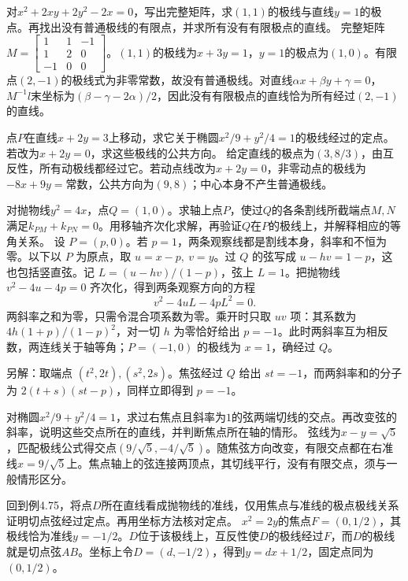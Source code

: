 对\(x^2+2xy+2y^2-2x=0\)，写出完整矩阵，求\((1,1)\)的极线与直线\(y=1\)的极点。再找出没有普通极线的有限点，并求所有没有有限极点的直线。
\solutionanswer
完整矩阵\(M=\begin{bmatrix}1&1&-1\\1&2&0\\-1&0&0\end{bmatrix}\)。\((1,1)\)的极线为\(x+3y=1\)，\(y=1\)的极点为\((1,0)\)。有限点\((2,-1)\)的极线式为非零常数，故没有普通极线。对直线\(\alpha x+\beta y+\gamma=0\)，\(M^{-1}l\)末坐标为\((\beta-\gamma-2\alpha)/2\)，因此没有有限极点的直线恰为所有经过\((2,-1)\)的直线。


点\(P\)在直线\(x+2y=3\)上移动，求它关于椭圆\(x^2/9+y^2/4=1\)的极线经过的定点。若改为\(x+2y=0\)，求这些极线的公共方向。
\solutionanswer
给定直线的极点为\((3,8/3)\)，由互反性，所有动极线都经过它。若动点线改为\(x+2y=0\)，非零动点的极线为\(-8x+9y=\text{常数}\)，公共方向为\((9,8)\)；中心本身不产生普通极线。


对抛物线\(y^2=4x\)，点\(Q=(1,0)\)。求轴上点\(P\)，使过\(Q\)的各条割线所截端点\(M,N\)满足\(k_{PM}+k_{PN}=0\)。用移轴齐次化求解，再验证\(Q\)在\(P\)的极线上，并解释相应的等角关系。
\solutionanswer
设 \(P=(p,0)\)。若 \(p=1\)，两条观察线都是割线本身，斜率和不恒为零。以下以 \(P\) 为原点，取 \(u=x-p,\ v=y\)。过 \(Q\) 的弦写成 \(u-hv=1-p\)，这也包括竖直弦。记 \(L=(u-hv)/(1-p)\)，弦上 \(L=1\)。把抛物线 \(v^2-4u-4p=0\) 齐次化，得到两条观察方向的方程
\[
    v^2-4uL-4pL^2=0 .
\]
两斜率之和为零，只需令混合项系数为零。乘开时只取 \(uv\) 项：其系数为 \(4h(1+p)/(1-p)^2\)，对一切 \(h\) 为零恰好给出 \(p=-1\)。此时两斜率互为相反数，两连线关于轴等角；\(P=(-1,0)\) 的极线为 \(x=1\)，确经过 \(Q\)。

另解：取端点 \((t^2,2t),(s^2,2s)\)。焦弦经过 \(Q\) 给出 \(st=-1\)，而两斜率和的分子为 \(2(t+s)(st-p)\)，同样立即得到 \(p=-1\)。


对椭圆\(x^2/9+y^2/4=1\)，求过右焦点且斜率为\(1\)的弦两端切线的交点。再改变弦的斜率，说明这些交点所在的直线，并判断焦点所在轴的情形。
\solutionanswer
弦线为\(x-y=\sqrt5\)，匹配极线公式得交点\((9/\sqrt5,-4/\sqrt5)\)。随焦弦方向改变，有限交点都在右准线\(x=9/\sqrt5\)上。焦点轴上的弦连接两顶点，其切线平行，没有有限交点，须与一般情形区分。


回到例4.75，将点\(D\)所在直线看成抛物线的准线，仅用焦点与准线的极点极线关系证明切点弦经过定点。再用坐标方法核对定点。
\solutionanswer
\(x^2=2y\)的焦点\(F=(0,1/2)\)，其极线恰为准线\(y=-1/2\)。\(D\)位于该极线上，互反性使\(D\)的极线经过\(F\)，而\(D\)的极线就是切点弦\(AB\)。坐标上令\(D=(d,-1/2)\)，得到\(y=dx+1/2\)，固定点同为\((0,1/2)\)。


